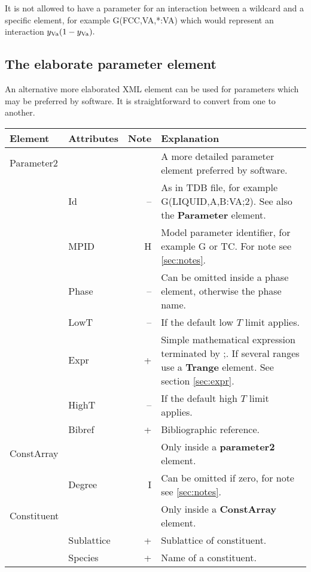\documentclass{article}
\begin{document}
It is not allowed to have a parameter for an interaction between a
wildcard and a specific element, for example G(FCC,VA,*:VA) which
would represent an interaction $y_{\rm Va}(1-y_{\rm Va}).$


\newpage 

\subsection{The elaborate parameter element}\label{sec:parameter2}

An alternative more elaborated XML element can be used for parameters
which may be preferred by software.  It is straightforward to convert
from one to another.

\bigskip
\begin{tabular}{|p{} p{} r p{}|}\hline
  Element & Attributes & Note & Explanation\\\hline

  Parameter2 & && A more detailed parameter element preferred by software.\\
      & Id & -- & As in TDB file, for example G(LIQUID,A,B:VA;2).  See also the {\bf Parameter} element. \\
      & MPID & H & Model parameter identifier, for example G or TC.  For note see \ref{sec:notes}.\\
      & Phase & -- & Can be omitted inside a phase element, otherwise the phase name.\\
      & LowT & -- & If the default low $T$ limit applies.\\
      & Expr & + & Simple mathematical expression terminated by ;.  If several ranges use a {\bf Trange} element.  See section \ref{sec:expr}.\\
      & HighT & -- & If the default high $T$ limit applies.\\
      & Bibref & + & Bibliographic reference.\\\hline

  ConstArray & && Only inside a {\bf parameter2} element.\\
      & Degree & I & Can be omitted if zero, for note see \ref{sec:notes}.\\\hline
  
  Constituent & && Only inside a {\bf ConstArray} element.\\
      & Sublattice & + &  Sublattice of constituent.\\
      & Species & + & Name of a constituent.\\\hline
\end{tabular}
\end{document}
